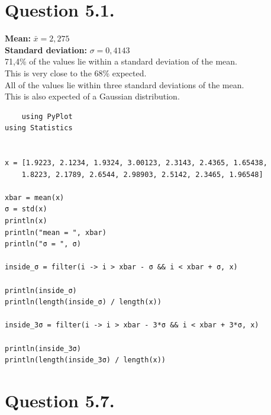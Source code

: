 \documentclass[11pt]{article}
\begin{document}
\section{Question 5.1.}
\textbf{Mean: } $\bar{x} = 2,275$ \\
\textbf{Standard deviation:} $\sigma = 0,4143$\\
71,4\% of the values lie within a standard deviation of the mean.\\
This is very close to the 68\% expected.\\
All of the values lie within three standard deviations of the mean. \\
This is also expected of a Gaussian distribution.

\begin{lstlisting}
	using PyPlot
using Statistics


x = [1.9223, 2.1234, 1.9324, 3.00123, 2.3143, 2.4365, 1.65438, 
    1.8223, 2.1789, 2.6544, 2.98903, 2.5142, 2.3465, 1.96548]

xbar = mean(x)
σ = std(x)
println(x)
println("mean = ", xbar)
println("σ = ", σ)

inside_σ = filter(i -> i > xbar - σ && i < xbar + σ, x)

println(inside_σ)
println(length(inside_σ) / length(x))

inside_3σ = filter(i -> i > xbar - 3*σ && i < xbar + 3*σ, x)

println(inside_3σ)
println(length(inside_3σ) / length(x))
\end{lstlisting}

\section{Question 5.7.}
\end{document}
